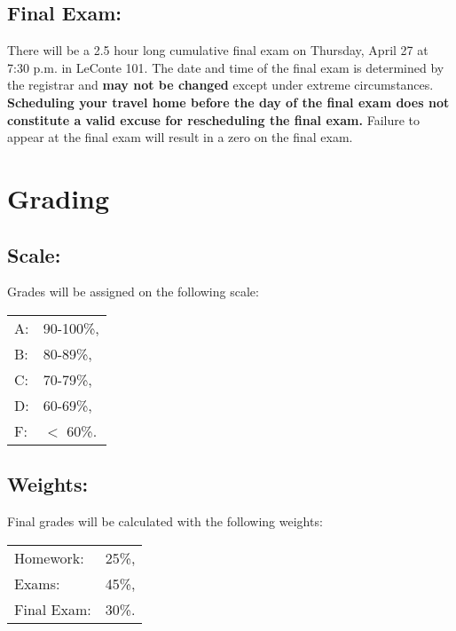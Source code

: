 \documentclass[10pt]{amsart}
\begin{document}
\subsection*{Final Exam:} 
There will be a 2.5 hour long cumulative final exam on Thursday, April 27 at 7:30 p.m. in LeConte 101.
The date and time of the final exam is determined by the registrar and \textbf{may not be changed} except under extreme circumstances.
\textbf{Scheduling your travel home before the day of the final exam does not constitute a valid excuse for rescheduling the final exam.}
Failure to appear at the final exam will result in a zero on the final exam.

\section*{Grading}
\subsection*{Scale:} 
Grades will be assigned on the following scale:
\begin{center}
  \begin{tabular}{ll}
    A: &90-100\%,\\
    B: & 80-89\%,\\
    C: & 70-79\%,\\
    D: & 60-69\%,\\
    F: & $<$ 60\%.\\
  \end{tabular}
\end{center}
\subsection*{Weights:} 
Final grades will be calculated with the following weights:
\begin{center}
  \begin{tabular}{lr}
    Homework: & 25\%,\\
    Exams: & 45\%,\\
    Final Exam: & 30\%.\\
  \end{tabular}
\end{center}

\newpage
\end{document}
